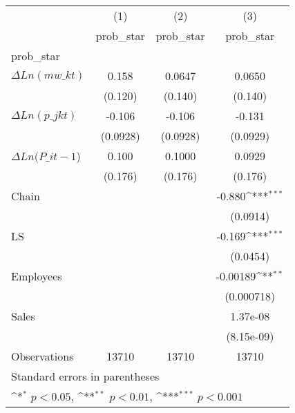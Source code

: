 {
\def\sym#1{\ifmmode^{#1}\else\(^{#1}\)\fi}
\begin{tabular}{l*{3}{c}}
\hline\hline
                    &\multicolumn{1}{c}{(1)}&\multicolumn{1}{c}{(2)}&\multicolumn{1}{c}{(3)}\\
                    &\multicolumn{1}{c}{prob\_star}&\multicolumn{1}{c}{prob\_star}&\multicolumn{1}{c}{prob\_star}\\
\hline
prob\_star           &                     &                     &                     \\
$\Delta Ln(mw\_{kt}) $&       0.158         &      0.0647         &      0.0650         \\
                    &     (0.120)         &     (0.140)         &     (0.140)         \\
[1em]
$ \Delta Ln(p\_{jkt}) $&      -0.106         &      -0.106         &      -0.131         \\
                    &    (0.0928)         &    (0.0928)         &    (0.0929)         \\
[1em]
$\Delta Ln(P\_{it-1}$)&       0.100         &      0.1000         &      0.0929         \\
                    &     (0.176)         &     (0.176)         &     (0.176)         \\
[1em]
Chain               &                     &                     &      -0.880\sym{***}\\
                    &                     &                     &    (0.0914)         \\
[1em]
LS                  &                     &                     &      -0.169\sym{***}\\
                    &                     &                     &    (0.0454)         \\
[1em]
Employees           &                     &                     &    -0.00189\sym{**} \\
                    &                     &                     &  (0.000718)         \\
[1em]
Sales               &                     &                     &    1.37e-08         \\
                    &                     &                     &  (8.15e-09)         \\
\hline
Observations        &       13710         &       13710         &       13710         \\
\hline\hline
\multicolumn{4}{l}{\footnotesize Standard errors in parentheses}\\
\multicolumn{4}{l}{\footnotesize \sym{*} \(p<0.05\), \sym{**} \(p<0.01\), \sym{***} \(p<0.001\)}\\
\end{tabular}
}
